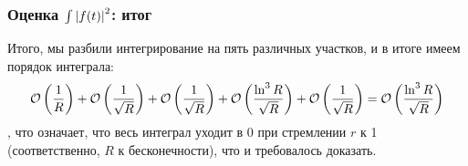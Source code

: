 \subsubsection{Оценка $\int \abs{f(t)}^2$: итог}
Итого, мы разбили интегрирование на пять различных участков, и в итоге имеем порядок интеграла:
\[
\mathcal{O} \left( \frac{1}{R} \right) + \mathcal{O} \left( \frac{1}{\sqrt{R}} \right) + \mathcal{O} \left( \frac{1}{\sqrt{R}} \right) + \mathcal{O}\left( \frac{\ln^3 R}{\sqrt{R}} \right) + \mathcal{O} \left( \frac{1}{\sqrt{R}} \right) = \mathcal{O}\left( \frac{\ln^3 R}{\sqrt{R}} \right)
\]
, что означает, что весь интеграл уходит в 0 при стремлении $r$ к 1 (соответственно, $R$ к бесконечности), что и требовалось доказать.